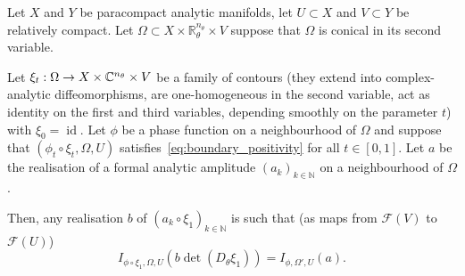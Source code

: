 \documentclass[10pt]{amsart}
\theoremstyle{definition}\newtheorem{defi}[theo]{Definition}\newtheorem{rema}[theo]{Remark}\newtheorem{exam}[theo]{Example}\newtheorem{exem}[theo]{Example}\newtheorem{nota}[theo]{Notation}
\DeclareMathOperator{\idd}{id}
\newcommand{\clF}{\mathcal{F}}
\newcommand\1{\mathds{1}}
\newcommand{\R}{\mathbb{R}}
\newcommand{\C}{\mathbb{C}}
\newcommand{\N}{\mathbb{N}}
\renewcommand*{\to}{\mathchoice{\longrightarrow}{\rightarrow}{\rightarrow}{\rightarrow}}
\begin{document}
\begin{prop}\label{prop:change_phase_variables}
Let $X$ and $Y$ be
paracompact analytic manifolds, let $U\subset X$ and $V\subset Y$ be relatively compact. Let $\Omega\subset X\times \R^{n_{\theta}}_{\theta}\times V$ suppose that $\Omega$ is conical in its second variable.

Let $\xi_t:\Omega\to X\times \C^{n_{\theta}}\times V$ be a family of contours (they extend into complex-analytic diffeomorphisms, are one-homogeneous in the second variable, act as identity on the first and third variables, depending smoothly on the parameter $t$) with $\xi_0=\idd$. Let $\phi$ be a phase function on a neighbourhood of $\Omega$ and suppose that $(\phi_t\circ
\xi_t,\Omega,U)$ satisfies~\eqref{eq:boundary_positivity} for all $t\in [0,1]$. Let $a$ be the realisation of a formal analytic amplitude $(a_k)_{k\in \N}$ on a neighbourhood of $\Omega$.

Then, any realisation $b$ of $(a_k\circ \xi_1)_{k\in \N}$ is such that (as maps from $\clF(V)$ to $\clF(U)$)
\[
I_{\phi\circ \xi_1,\Omega,U}(b\det(D_{\theta}\xi_1))=I_{\phi,\Omega',U}(a).
\]
\end{prop}
\end{document}
